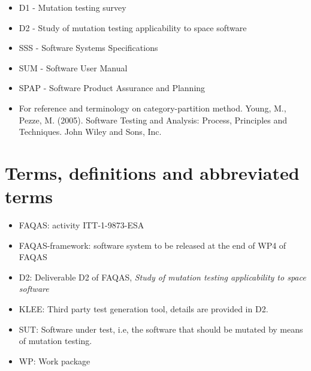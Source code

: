 \begin{itemize}
\item{D1 - Mutation testing survey}
\item{D2 - Study of mutation testing applicability to space software}
\item{SSS - Software Systems Specifications}
\item{SUM - Software User Manual}
\item{SPAP - Software Product Assurance and Planning}
\item{For reference and terminology on category-partition method. Young, M., Pezze, M. (2005). Software Testing and Analysis: Process, Principles and Techniques. John Wiley and Sons, Inc.}
\end{itemize}

\chapter{Terms, definitions and abbreviated terms}

\begin{itemize}
\item{FAQAS}: activity ITT-1-9873-ESA
\item{FAQAS-framework}: software system to be released at the end of WP4 of FAQAS
\item{D2}: Deliverable D2 of FAQAS, \emph{Study of mutation testing applicability to space software}
\item{KLEE}: Third party test generation tool, details are provided in D2.
\item{SUT}: Software under test, i.e, the software that should be mutated by means of mutation testing.
\item{WP}: Work package
\end{itemize}

\clearpage
